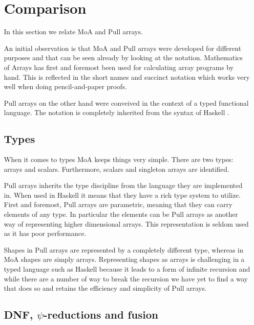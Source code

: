 \documentclass{sigplanconf}
\begin{document}
\section{Comparison}

In this section we relate MoA and Pull arrays. 

An initial observation is that MoA and Pull arrays were developed for
different purposes and that can be seen already by looking at the
notation. Mathematics of Arrays has first and foremost been used for
calculating array programs by hand. This is reflected in the short
names and succinct notation which works very well when doing
pencil-and-paper proofs.

Pull arrays on the other hand were conveived in the context of a
typed functional language. The notation is completely inherited from
the syntax of Haskell \cite{marlow2010haskell}.

\subsection{Types}
\label{sec:types}

When it comes to types MoA keeps things very simple. There are two
types: arrays and scalars. Furthermore, scalars and singleton arrays
are identified.

Pull arrays inherits the type discipline from the language they are
implemented in. When used in Haskell it means that they have a rich
type system to utilize. First and foremost, Pull arrays are
parametric, meaning that they can carry elements of any type. In
particular the elements can be Pull arrays as another way of
representing higher dimensional arrays. This representation is seldom
used as it has poor performance.

Shapes in Pull arrays are represented by a completely different type,
whereas in MoA shapes are simply arrays. Representing shapes as arrays
is challenging in a typed language such as Haskell because it leads to
a form of infinite recursion and while there are a number of way to
break the recursion we have yet to find a way that does so and retains
the efficiency and simplicity of Pull arrays.

\subsection{DNF, \(\psi\)-reductions and fusion}
\label{sec:normalization}
\end{document}
